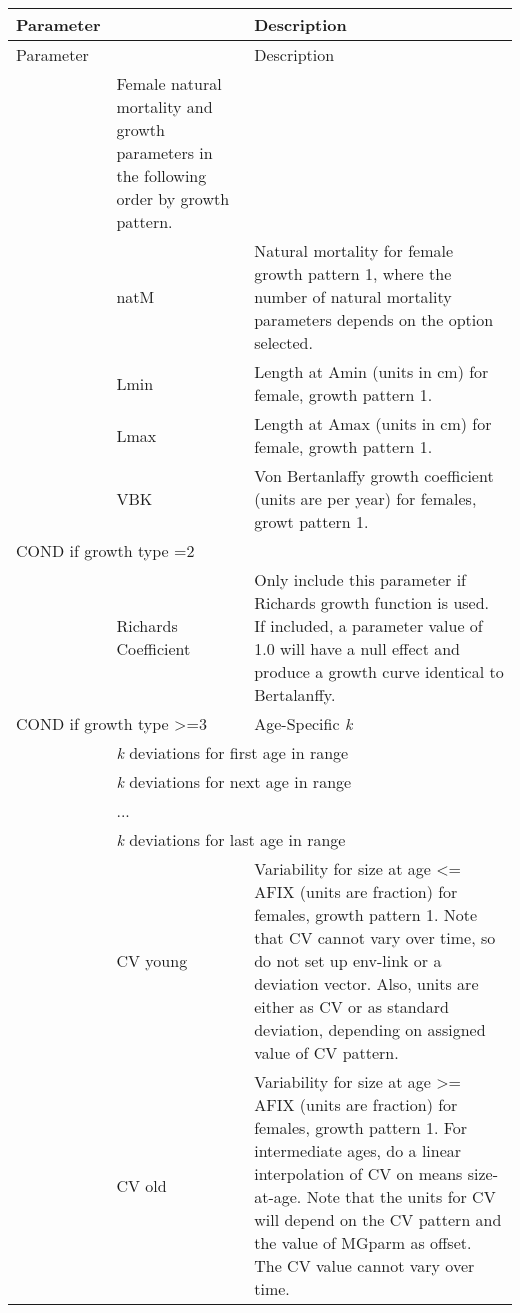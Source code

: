 \begin{longtable}{p{1cm} p{2.5cm} p{10cm}}
	\hline
	Parameter& & Description\Tstrut\Bstrut\\
	\hline
	\endfirsthead

	\hline
	Parameter& & Description\Tstrut\Bstrut\\
	\hline
	\endhead

	\hline
	\endfoot

	\endlastfoot

	\multicolumn{2}{l}{Females}\Tstrut & Female natural mortality and growth parameters in the following order by growth pattern.\\
	& natM & Natural mortality for female growth pattern 1, where the number of natural mortality parameters depends on the option selected.\\
	& Lmin & Length at Amin (units in cm) for female, growth pattern 1. \\
	& Lmax & Length at Amax (units in cm) for female, growth pattern 1. \\
	& VBK & Von Bertanlaffy growth coefficient (units are per year) for females, growt pattern 1.\Bstrut\\
	\hline

	\multicolumn{2}{l}{COND if growth type =2 } & \Tstrut\\
	& Richards Coefficient & Only include this parameter if Richards growth function is used.  If included, a parameter value of 1.0 will have a null effect and produce a growth curve identical to Bertalanffy.\\

	\multicolumn{2}{l}{COND if growth type >=3 } & Age-Specific \textit{k}\\
	& \multicolumn{2}{l}{\textit{k} deviations for first age in range}\\
	& \multicolumn{2}{l}{\textit{k} deviations for next age in range}\\
	& ... & \\
	& \multicolumn{2}{l}{\textit{k} deviations for last age in range}\Bstrut\\
	\hline

    \Tstrut & CV young & Variability for size at age <= AFIX (units are fraction) for females, growth pattern 1.  Note that CV cannot vary over time, so do not set up env-link or a deviation vector.  Also, units are either as CV or as standard deviation, depending on assigned value of CV pattern.\\
	& CV old & Variability for size at age >= AFIX (units are fraction) for females, growth pattern 1. For intermediate ages, do a linear interpolation of CV on means size-at-age.  Note that the units for CV will depend on the CV pattern and the value of MGparm as offset. The CV value cannot vary over time.\Bstrut\\
	\hline


\end{longtable}

